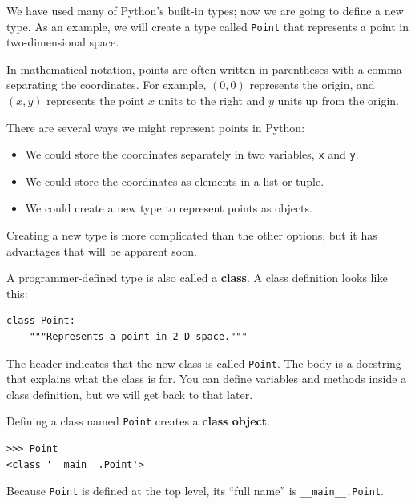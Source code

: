 \documentclass[10pt]{book}
\begin{document}
We have used many of Python's built-in types; now we are going
to define a new type.  As an example, we will create a type
called {\tt Point} that represents a point in two-dimensional
space.

In mathematical notation, points are often written in
parentheses with a comma separating the coordinates. For example,
$(0,0)$ represents the origin, and $(x,y)$ represents the
point $x$ units to the right and $y$ units up from the origin.

There are several ways we might represent points in Python:

\begin{itemize}

\item We could store the coordinates separately in two
variables, {\tt x} and {\tt y}.

\item We could store the coordinates as elements in a list
or tuple.

\item We could create a new type to represent points as
objects.

\end{itemize}

Creating a new type
is more complicated than the other options, but
it has advantages that will be apparent soon.

A programmer-defined type is also called a {\bf class}.
A class definition looks like this:

\begin{verbatim}
class Point:
    """Represents a point in 2-D space."""
\end{verbatim}
%
The header indicates that the new class is called {\tt Point}.
The body is a docstring that explains what the class is for.
You can define variables and methods inside a class definition,
but we will get back to that later.

Defining a class named {\tt Point} creates a {\bf class object}.

\begin{verbatim}
>>> Point
<class '__main__.Point'>
\end{verbatim}
%
Because {\tt Point} is defined at the top level, its ``full
name'' is \verb"__main__.Point".
\end{document}
